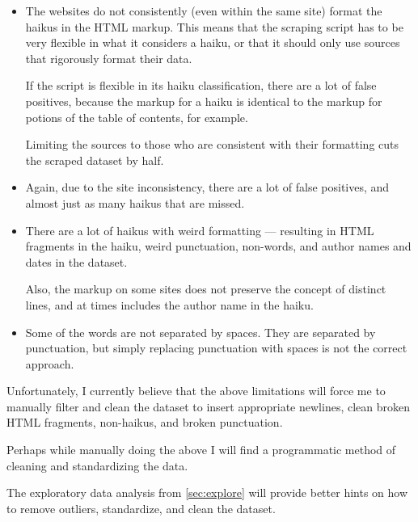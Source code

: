 \begin{itemize}
    \item The websites do not consistently (even within the same site) format the haikus in the
          HTML markup. This means that the scraping script has to be very flexible in what it
          considers a haiku, or that it should only use sources that rigorously format their data.

          If the script is flexible in its haiku classification, there are a lot of false
          positives, because the markup for a haiku is identical to the markup for potions of the
          table of contents, for example.

          Limiting the sources to those who are consistent with their formatting cuts the scraped
          dataset by half.
    \item Again, due to the site inconsistency, there are a lot of false positives, and almost just
          as many haikus that are missed.
    \item There are a lot of haikus with weird formatting --- resulting in HTML fragments in the
          haiku, weird punctuation, non-words, and author names and dates in the dataset.

          Also, the markup on some sites does not preserve the concept of distinct lines, and at
          times includes the author name in the haiku.
    \item Some of the words are not separated by spaces. They are separated by punctuation, but
          simply replacing punctuation with spaces is not the correct approach.
\end{itemize}

Unfortunately, I currently believe that the above limitations will force me to manually filter and
clean the dataset to insert appropriate newlines, clean broken HTML fragments, non-haikus, and
broken punctuation.

Perhaps while manually doing the above I will find a programmatic method of cleaning and
standardizing the data.

The exploratory data analysis from \autoref{sec:explore} will provide better hints on how to remove
outliers, standardize, and clean the dataset.
